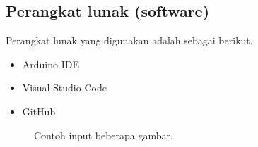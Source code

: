\subsection {Perangkat lunak (software)}
Perangkat lunak yang digunakan adalah sebagai berikut.
\begin{itemize}
 \item Arduino IDE
 \item Visual Studio Code
 \item GitHub
\end{itemize}


\begin{figure}
  \centering
  \hfil
  \caption{Contoh input beberapa gambar.}
  \label{fig:hasil}
\end{figure}

\lipsum[16-18]



\lipsum[19-20]
